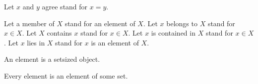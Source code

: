 \begin{forthel}

  Let $x$ and $y$ agree stand for $x = y$.

  Let a member of $X$ stand for an element of $X$.
  Let $x$ belongs to $X$ stand for $x \in X$.
  Let $X$ contains $x$ stand for $x \in X$.
  Let $x$ is contained in $X$ stand for $x \in X$.
  Let $x$ lies in $X$ stand for $x$ is an element of $X$.

  \begin{definition}
    An element is a setsized object.
  \end{definition}

  \begin{axiom}
    Every element is an element of some set.
  \end{axiom}
\end{forthel}
